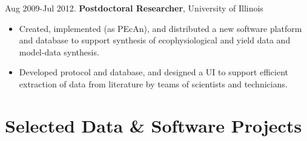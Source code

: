 \documentclass[a4paper,10pt]{article}
\begin{document}
Aug 2009-Jul 2012. \textbf{Postdoctoral Researcher}, University of Illinois

\begin{itemize}
\item Created, implemented (as PEcAn), and distributed a new software platform and database to support synthesis of ecophysiological and yield data and model-data synthesis.
\item Developed protocol and database, and designed a UI to support efficient extraction of data from literature by teams of scientists and technicians.  
\end{itemize}



\section{Selected Data \& Software Projects}
\vspace{0.5em}
\end{document}
